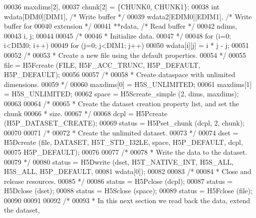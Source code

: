 \begin{DoxyCode}
00036                     maxdims[2],
00037                     chunk[2] = \{CHUNK0, CHUNK1\};
00038     \textcolor{keywordtype}{int}             wdata[DIM0][DIM1],          \textcolor{comment}{/* Write buffer */}
00039                     wdata2[EDIM0][EDIM1],       \textcolor{comment}{/* Write buffer for}
00040 \textcolor{comment}{                                                   extension */}
00041                     **rdata,                    \textcolor{comment}{/* Read buffer */}
00042                     ndims,
00043                     i, j;
00044 
00045     \textcolor{comment}{/*}
00046 \textcolor{comment}{     * Initialize data.}
00047 \textcolor{comment}{     */}
00048     \textcolor{keywordflow}{for} (i=0; i<DIM0; i++)
00049         \textcolor{keywordflow}{for} (j=0; j<DIM1; j++)
00050             wdata[i][j] = i * j - j;
00051 
00052     \textcolor{comment}{/*}
00053 \textcolor{comment}{     * Create a new file using the default properties.}
00054 \textcolor{comment}{     */}
00055     file = H5Fcreate (FILE, H5F\_ACC\_TRUNC, H5P\_DEFAULT, H5P\_DEFAULT);
00056 
00057     \textcolor{comment}{/*}
00058 \textcolor{comment}{     * Create dataspace with unlimited dimensions.}
00059 \textcolor{comment}{     */}
00060     maxdims[0] = H5S\_UNLIMITED;
00061     maxdims[1] = H5S\_UNLIMITED;
00062     space = H5Screate\_simple (2, dims, maxdims);
00063 
00064     \textcolor{comment}{/*}
00065 \textcolor{comment}{     * Create the dataset creation property list, and set the chunk}
00066 \textcolor{comment}{     * size.}
00067 \textcolor{comment}{     */}
00068     dcpl = H5Pcreate (H5P\_DATASET\_CREATE);
00069     status = H5Pset\_chunk (dcpl, 2, chunk);
00070 
00071     \textcolor{comment}{/*}
00072 \textcolor{comment}{     * Create the unlimited dataset.}
00073 \textcolor{comment}{     */}
00074     dset = H5Dcreate (file, DATASET, H5T\_STD\_I32LE, space, H5P\_DEFAULT, dcpl,
00075                 H5P\_DEFAULT);
00076 
00077     \textcolor{comment}{/*}
00078 \textcolor{comment}{     * Write the data to the dataset.}
00079 \textcolor{comment}{     */}
00080     status = H5Dwrite (dset, H5T\_NATIVE\_INT, H5S\_ALL, H5S\_ALL, H5P\_DEFAULT,
00081                 wdata[0]);
00082 
00083     \textcolor{comment}{/*}
00084 \textcolor{comment}{     * Close and release resources.}
00085 \textcolor{comment}{     */}
00086     status = H5Pclose (dcpl);
00087     status = H5Dclose (dset);
00088     status = H5Sclose (space);
00089     status = H5Fclose (file);
00090 
00091 
00092     \textcolor{comment}{/*}
00093 \textcolor{comment}{     * In this next section we read back the data, extend the dataset,}

\end{DoxyCode}
